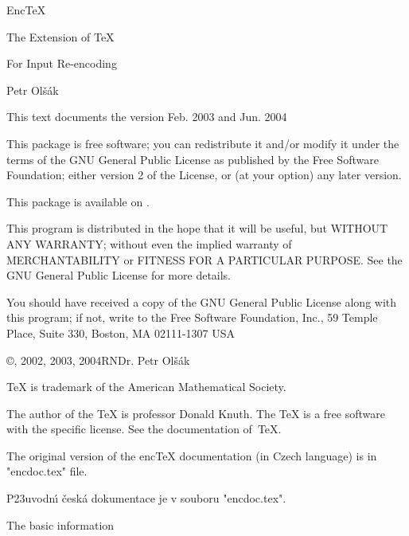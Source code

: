 {\nopagenumbers

\vglue 4cm

\centerline {\titulfont Enc\TeX}
\vskip2cm
\centerline {\titulfont The Extension of \TeX{}} 
\medskip
\centerline {\titulfont For Input Re-encoding}

\vskip3cm

\centerline{\bigbf Petr Ol\v s\'ak}

\vskip2cm

\centerline{}

\vfil

\centerline {\bigbf This text documents the version Feb. 2003 and Jun. 2004}

\vskip 4cm 
\break

\null \vfil

This package is free software; you can redistribute it and/or modify
it under the terms of the GNU General Public License as published by
the Free Software Foundation; either version 2 of the License, or
(at your option) any later version.

This package is available on
.

This program is distributed in the hope that it will be useful,
but WITHOUT ANY WARRANTY; without even the implied warranty of
MERCHANTABILITY or FITNESS FOR A PARTICULAR PURPOSE.  See the
GNU General Public License for more details.

You should have received a copy of the GNU General Public License
along with this program; if not, write to the Free Software
Foundation, Inc., 59 Temple Place, Suite 330, Boston, MA  02111-1307  USA

\bigskip 
\copyright{}, 2002, 2003, 2004\enspace RNDr. Petr Ol\v s\'ak

\bigskip
\TeX{} is trademark of the American Mathematical Society.

\bigskip
The author of the \TeX{} is professor Donald Knuth. The \TeX{}
is a free software with the specific license. See the documentation
of~\TeX.

\bigskip
The original version of the enc\TeX{} documentation (in Czech language) is in 
"encdoc.tex" file.

P\accent23uvodn\'\i{} \v cesk\'a dokumentace je v souboru "encdoc.tex".

\break
}

\kap The basic information


